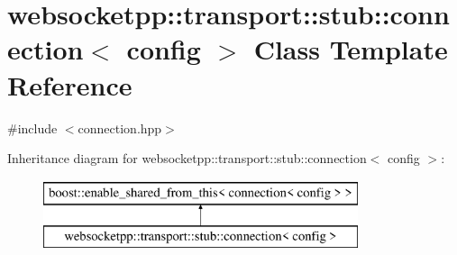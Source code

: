 \hypertarget{classwebsocketpp_1_1transport_1_1stub_1_1connection}{}\section{websocketpp\+:\+:transport\+:\+:stub\+:\+:connection$<$ config $>$ Class Template Reference}
\label{classwebsocketpp_1_1transport_1_1stub_1_1connection}


{\ttfamily \#include $<$connection.\+hpp$>$}

Inheritance diagram for websocketpp\+:\+:transport\+:\+:stub\+:\+:connection$<$ config $>$\+:\begin{figure}[H]
\begin{center}
\leavevmode
\includegraphics[height=2.000000cm]{classwebsocketpp_1_1transport_1_1stub_1_1connection}
\end{center}
\end{figure}
